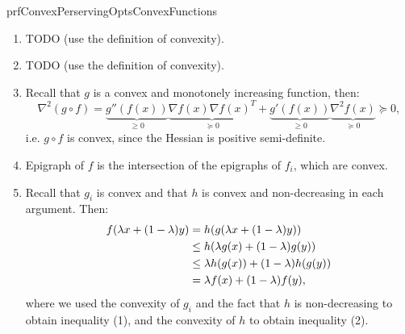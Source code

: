 \begin{prf}{prfConvexPerservingOptsConvexFunctions}
    \begin{enumerate}
        \item 
            TODO (use the definition of convexity).
        \item 
            TODO (use the definition of convexity).
        \item 
            Recall that $g$ is a convex and monotonely increasing function, then: 
            \begin{equation*}
                \nabla^2 (g \circ f) = \underbrace{g''(f(x))}_{\geq 0} \underbrace{\nabla f(x) \nabla {f(x)}^T }_{\succeq 0} + \underbrace{g'(f(x))}_{\geq 0} \underbrace{\nabla^2 f(x)}_{\succeq 0} \succeq 0,
            \end{equation*}
            i\@.e\@. $g \circ f$ is convex, since the Hessian is positive semi-definite.
        \item 
            Epigraph of $f$ is the intersection of the epigraphs of $f_i$, which are convex.
        \item
            Recall that $g_i$ is convex and that $h$ is convex and non-decreasing in each argument. Then:
            \begin{align}
                f(\lambda x + (1 - \lambda)y) 
                    &= h(g(\lambda x + (1 - \lambda)y)) \notag \\
                    &\leq h(\lambda g(x) + (1 - \lambda)g(y)) \\
                    &\leq \lambda h(g(x)) + (1 - \lambda)h(g(y)) \\
                    &= \lambda f(x) + (1 - \lambda)f(y), \notag
            \end{align}
            where we used the convexity of $g_i$ and the fact that $h$ is non-decreasing to obtain inequality (1), and the convexity of $h$ to obtain inequality (2). 
    \end{enumerate}
    \vspace*{-0.2cm}
\end{prf}



